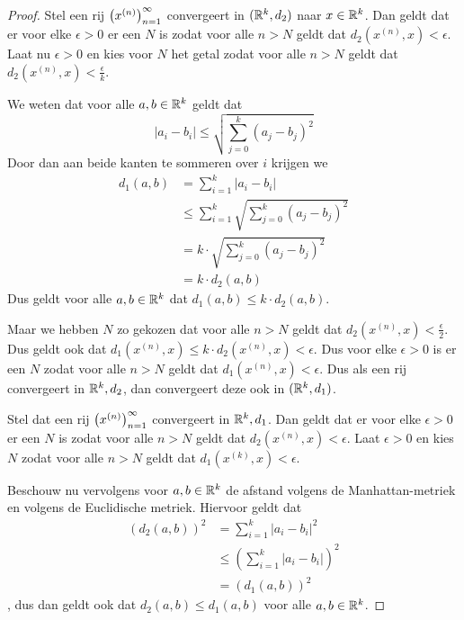 \label{sec:eqeucman}
\begin{proof}
    Stel een rij \(\left(x^{(n)}\right)_{n=1}^{\infty}\) convergeert in \((\mathbb{R}^{k},d_{2})\) naar \(x\in\mathbb{R}^{k}\). Dan geldt dat er voor elke \(\epsilon>0\) er een \(N\) is zodat voor alle \(n>N\) geldt dat \(d_{2}(x^{(n)},x)<\epsilon\). Laat nu \(\epsilon>0\) en kies voor \(N\) het getal zodat voor alle \(n>N\) geldt dat \(d_{2}\left(x^{(n)},x\right)<\frac{\epsilon}{k}\).

    We weten dat voor alle \(a,b\in\mathbb{R}^{k}\) geldt dat 
    \[
        \left|a_{i}-b_{i}\right|\leq\sqrt{\sum\limits_{j=0}^{k}(a_{j}-b_{j})^{2}}
    \]
    Door dan aan beide kanten te sommeren over \(i\) krijgen we
    \begin{align*}
        d_{1}(a,b)&= \sum\limits_{i=1}^{k}\left|a_{i}-b_{i}\right|\\
        &\leq \sum\limits_{i=1}^{k}\sqrt{\sum\limits_{j=0}^{k}(a_{j}-b_{j})^{2}}\\
        &=k\cdot\sqrt{\sum\limits_{j=0}^{k}(a_{j}-b_{j})^{2}}\\
        &=k\cdot d_{2}(a,b)
    \end{align*}
    Dus geldt voor alle \(a,b\in\mathbb{R}^{k}\) dat \(d_{1}(a,b)\leq k\cdot d_{2}(a,b)\).

    Maar we hebben \(N\) zo gekozen dat voor alle \(n>N\) geldt dat \(d_{2}(x^{(n)},x)<\frac{\epsilon}{2}\). Dus geldt ook dat \(d_{1}(x^{(n)},x)\leq k\cdot d_{2}(x^{(n)},x)<\epsilon\). Dus voor elke \(\epsilon>0\) is er een \(N\) zodat voor alle \(n>N\) geldt dat \(d_{1}(x^{(n)},x)<\epsilon\). Dus als een rij convergeert in \(\mathbb{R}^{k}, d_{2}\), dan convergeert deze ook in \((\mathbb{R}^{k},d_{1})\).

    Stel dat een rij \(\left(x^{(n)}\right)_{n=1}^{\infty}\) convergeert in \(\mathbb{R}^{k},d_{1}\). Dan geldt dat er voor elke \(\epsilon>0\) er een \(N\) is zodat voor alle \(n>N\) geldt dat \(d_{2}(x^{(n)},x)<\epsilon\). Laat \(\epsilon>0\) en kies \(N\) zodat voor alle \(n>N\) geldt dat \(d_{1}(x^{(k)},x)<\epsilon\).

    Beschouw nu vervolgens voor \(a,b\in\mathbb{R}^{k}\) de afstand volgens de Manhattan-metriek en volgens de Euclidische metriek. Hiervoor geldt dat
    \begin{align*}
        \left(d_{2}(a,b)\right)^{2}& =\sum\limits_{i=1}^{k}\left|a_{i}-b_{i}\right|^{2}\\
        &\leq \left(\sum\limits_{i=1}^{k}\left|a_{i}-b_{i}\right|\right)^{2}\\
        &= \left(d_{1}(a,b)\right)^{2}
    \end{align*}
    , dus dan geldt ook dat \(d_{2}(a,b)\leq d_{1}(a,b)\) voor alle \(a,b\in\mathbb{R}^{k}\).


\end{proof}
